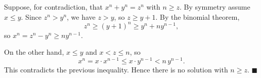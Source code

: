 Suppose, for contradiction, that \(x^n+y^n=z^n\) with \(n\ge z\). By symmetry assume \(x\le y\). Since \(z^n>y^n\), we have \(z>y\), so \(z\ge y+1\). By the binomial theorem,
\[
z^n\ge (y+1)^n\ge y^n+ny^{n-1},
\]
so \(x^n=z^n-y^n\ge ny^{n-1}\).

On the other hand, \(x\le y\) and \(x<z\le n\), so
\[
x^n=x\cdot x^{n-1}\le x\cdot y^{n-1}<n\,y^{n-1}.
\]
This contradicts the previous inequality. Hence there is no solution with \(n\ge z\). \(\blacksquare\)
